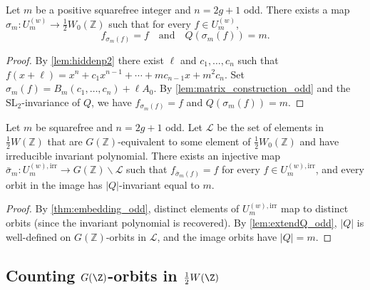\begin{theorem}
  \label{thm:embedding_odd}
  Let \(m\) be a positive squarefree integer and \(n=2g+1\) odd.
  There exists a map \(\sigma_m:U_m^{(w)}\to\tfrac12 W_0(\mathbb{Z})\)
  such that for every \(f\in U_m^{(w)}\),
  \[
    f_{\sigma_m(f)}=f \quad\text{and}\quad Q(\sigma_m(f))=m.
  \]
\end{theorem}
\begin{proof}
  By \cref{lem:hiddenp2} there exist \(\ell\) and \(c_1,\ldots,c_n\)
  such that \(f(x+\ell)=x^n+c_1x^{n-1}+\cdots+mc_{n-1}x+m^2c_n\).
  Set \(\sigma_m(f)=B_m(c_1,\ldots,c_n)+\ell A_0\).  By
  \cref{lem:matrix_construction_odd} and the \(\mathrm{SL}_2\)-invariance
  of \(Q\), we have \(f_{\sigma_m(f)}=f\) and \(Q(\sigma_m(f))=m\).
\end{proof}

\begin{theorem}
  \label{thm:orbit_injection_odd}
  Let \(m\) be squarefree and \(n=2g+1\) odd.  Let
  \(\mathcal{L}\) be the set of elements in \(\tfrac12 W(\mathbb{Z})\)
  that are \(G(\mathbb{Z})\)-equivalent to some element of
  \(\tfrac12 W_0(\mathbb{Z})\) and have irreducible invariant polynomial.
  There exists an injective map
  \(\bar\sigma_m:U_m^{(w),\mathrm{irr}}\to G(\mathbb{Z})\backslash\mathcal{L}\)
  such that \(f_{\bar\sigma_m(f)}=f\) for every
  \(f\in U_m^{(w),\mathrm{irr}}\), and every orbit in the image has
  \(|Q|\)-invariant equal to \(m\).
\end{theorem}
\begin{proof}
  By \cref{thm:embedding_odd}, distinct elements of
  \(U_m^{(w),\mathrm{irr}}\) map to distinct orbits (since the
  invariant polynomial is recovered).  By \cref{lem:extendQ_odd},
  \(|Q|\) is well-defined on \(G(\mathbb{Z})\)-orbits in
  \(\mathcal{L}\), and the image orbits have \(|Q|=m\).
\end{proof}

\subsection{Counting $G(\Z)$-orbits in $\frac12W(\Z)$}

